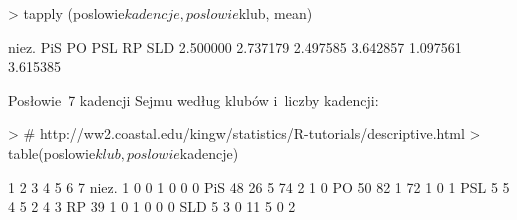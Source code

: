 \documentclass[a4paper]{article}
\begin{document}
\begin{Schunk}
\begin{Sinput}
> tapply (poslowie$kadencje, poslowie$klub, mean)
\end{Sinput}
\begin{Soutput}
   niez.      PiS       PO      PSL       RP      SLD 
2.500000 2.737179 2.497585 3.642857 1.097561 3.615385 
\end{Soutput}
\end{Schunk}

Posłowie~7 kadencji Sejmu według klubów i~liczby kadencji:

\begin{Schunk}
\begin{Sinput}
> # http://ww2.coastal.edu/kingw/statistics/R-tutorials/descriptive.html
> table(poslowie$klub, poslowie$kadencje)
\end{Sinput}
\begin{Soutput}
         1  2  3  4  5  6  7
  niez.  1  0  0  1  0  0  0
  PiS   48 26  5 74  2  1  0
  PO    50 82  1 72  1  0  1
  PSL    5  5  4  5  2  4  3
  RP    39  1  0  1  0  0  0
  SLD    5  3  0 11  5  0  2
\end{Soutput}
\end{Schunk}
\end{document}
